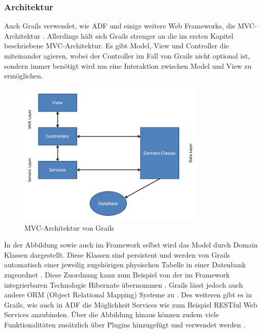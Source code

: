 \subsubsection{Architektur}
Auch Grails verwendet, wie ADF und einige weitere Web Frameworks, die MVC-Architektur \autocite[S.208]{GGR2009}. Allerdings hält sich Grails strenger an die im ersten Kapitel beschriebene MVC-Architektur. Es gibt Model, View und Controller die miteinander agieren, wobei der Controller im Fall von Grails nicht optional ist, sondern immer benötigt wird um eine Interaktion zwischen Model und View zu ermöglichen\autocite[S.8]{DGG2002}.\\
\begin{figure}[H]
\centering
\includegraphics[width=0.80\textwidth]{img/Folie1.png}
\caption {MVC-Architektur von Grails \autocite[S.220]{GGR2009}}
\end{figure}
In der Abbildung sowie auch im Framework selbst wird das Model durch Domain Klassen dargestellt. Diese Klassen sind persistent und werden von Grails automatisch einer jeweilig zugehörigen physischen Tabelle in einer Datenbank zugeordnet \autocite[S.17]{DGG2002}. Diese Zuordnung kann zum Beispiel von der im Framework integrierbaren Technologie Hibernate übernommen \autocite[S.18]{DGG2002}. Grails lässt jedoch auch andere ORM (Object Relational Mapping) Systeme zu \autocite{GPO2015}. Des weiteren gibt es in Grails, wie auch in ADF die Möglichkeit Services wie zum Beispiel RESTful Web Services anzubinden. Über die Abbildung hinaus können zudem viele Funktionalitäten zusätzlich über Plugins hinzugefügt und verwendet werden \autocite[S.3]{DGG2002}.\\

